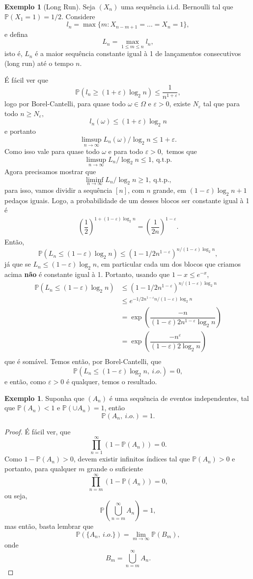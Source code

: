 \documentclass[12pt,a4paper,oneside]{book}
\theoremstyle{definition}
\newtheorem{example}[theorem]{Exemplo}
\theoremstyle{remark}
\numberwithin{equation}{section}
\newcommand{\e}{\varepsilon}
\newcommand{\pr}{\mathbb{P}}
\begin{document}
\begin{example}[Long Run] Seja $(X_n)$ uma sequência i.i.d. Bernoulli tal que $\pr(X_1=1)=1/2.$ Considere 
$$l_n=\max\{m: X_{n-m+1} = \dots = X_n = 1 \},$$
e defina
$$L_n = \max_{1\leq m\leq n}l_n, $$
isto é, $L_n$ é a maior sequência constante igual à 1 de lançamentos consecutivos (long run) até o tempo $n$.

É fácil ver que
$$\pr(l_n \geq (1+\e)\log_2 n) \leq \dfrac{1}{n^{1+\e}}, $$
logo por Borel-Cantelli, para quase todo  $\omega\in \Omega$ e $\e>0$, existe $N_\e$ tal que para todo $n\geq N_\e,$
$$l_n(\omega) \leq (1+\e)\log_2n $$
e portanto
$$\limsup_{n\rightarrow \infty} L_n(\omega)/\log_2n \leq 1+\e.$$
Como isso vale para quase todo $\omega$ e para todo $\e>0,$ temos que
$$\limsup_{n\rightarrow \infty} L_n/\log_2n \leq 1, \ \textrm{q.t.p.}$$
Agora precisamos mostrar que 
$$\liminf_{n\rightarrow \infty} L_n/\log_2n \geq 1, \ \textrm{q.t.p.},$$
para isso, vamos dividir a sequência $[n]$, com $n$ grande, em $(1-\e)\log_2n+1$ pedaços iguais. Logo, a probabilidade de um desses blocos ser constante igual à 1 é 
\begin{align*}
\left(\dfrac{1}{2}\right)^{1+(1-\e)\log_2 n} = \left( \dfrac{1}{2n} \right)^{1-\e}.
\end{align*}
Então, 
$$\pr(L_n \leq (1-\e)\log_2 n) \leq (1- 1/2n^{1-\e})^{n/(1-\e)\log_2 n}, $$
já que se $L_n\leq (1-\e)\log_2n$, em particular cada um dos blocos que criamos acima \textbf{não} é constante igual à 1. Portanto, usando que $1-x\leq e^{-x}$,
\begin{align*}
\pr(L_n \leq (1-\e)\log_2 n) &\leq (1- 1/2n^{1-\e})^{n/(1-\e)\log_2 n}\\
&\leq e^{- 1/2n^{1-\e}n/(1-\e)\log_2 n}\\
& = \exp\left(     \dfrac{-n}{(1-\e)2n^{1-\e}\log_2n}\right)\\
&= \exp\left(     \dfrac{-n^{\e}}{(1-\e)2\log_2n}\right)\\
\end{align*}
que é somável. Temos então, por Borel-Cantelli, que 
$$\pr(L_n \leq (1-\e)\log_2 n,\ i.o.)=0, $$
e então, como $\e>0$ é qualquer, temos o resultado.

\end{example}

\begin{example}
Suponha que $(A_n)$ é uma sequência de eventos independentes, tal que $\pr(A_n)<1$ e $\pr(\cup A_n) = 1$, então 
$$\pr(A_n,\ i.o.)=1. $$
\end{example}
\begin{proof}
É fácil ver, que
$$\prod^\infty_{n=1} (1 -\pr(A_n)) = 0. $$
Como $1-\pr(A_n)>0$, devem existir infinitos índices tal que $\pr(A_n)>0$ e portanto, para qualquer $m$ grande o suficiente
$$\prod^\infty_{n=m} (1 -\pr(A_n)) = 0, $$
ou seja, 
$$\pr(\bigcup_{n=m}^\infty A_n) = 1, $$
mas então, basta lembrar que
$$\pr(\{A_n,\ i.o.\}) = \lim_{m\rightarrow \infty} \pr(B_m), $$
onde 
$$B_m = \bigcup_{n=m}^\infty A_n .$$
\end{proof}
\end{document}
